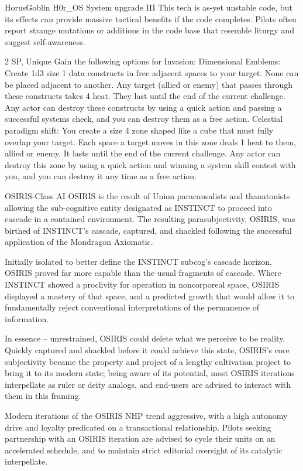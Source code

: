 \begin{mech}{Horus}{Goblin}
H0r\_OS System upgrade III
This tech is as-yet unstable code, but its effects can provide massive tactical benefits if the code completes. Pilots often report strange mutations or additions in the code base that resemble liturgy and suggest self-awareness.

2 SP, Unique
Gain the following options for Invasion:
Dimensional Emblems: Create 1d3 size 1 data constructs in free adjacent spaces to your target. None can be placed adjacent to another. Any target (allied or enemy) that passes through these constructs takes 4 heat. They last until the end of the current challenge. Any actor can destroy these constructs by using a quick action and passing a successful systems check, and you can destroy them as a free action.
Celestial paradigm shift: You create a size 4 zone shaped like a cube that must fully overlap your target. Each space a target moves in this zone deals 1 heat to them, allied or enemy. It lasts until the end of the current challenge. Any actor can destroy this zone by using a quick action and winning a system skill contest with you, and you can destroy it any time as a free action.

OSIRIS-Class AI
OSIRIS is the result of Union paracausalists and thanatonists allowing the sub-cognitive entity designated as INSTINCT to proceed into cascade in a contained environment. The resulting parasubjectivity, OSIRIS, was birthed of INSTINCT’s cascade, captured, and shackled following the successful application of the Mondragon Axiomatic.

Initially isolated to better define the INSTINCT subcog’s cascade horizon, OSIRIS proved far more capable than the usual fragments of cascade. Where INSTINCT showed a proclivity for operation in noncorporeal space, OSIRIS displayed a mastery of that space, and a predicted growth that would allow it to fundamentally reject conventional interpretations of the permanence of information.

In essence -- unrestrained, OSIRIS could delete what we perceive to be reality. Quickly captured and shackled before it could achieve this state, OSIRIS’s core subjectivity became the property and project of a lengthy cultivation project to bring it to its modern state; being aware of its potential, most OSIRIS iterations interpellate as ruler or deity analogs, and end-users are advised to interact with them in this framing.

Modern iterations of the OSIRIS NHP trend aggressive, with a high autonomy drive and loyalty predicated on a transactional relationship. Pilots seeking partnership with an OSIRIS iteration are advised to cycle their units on an accelerated schedule, and to maintain strict editorial oversight of its catalytic interpellate.


\end{mech}
